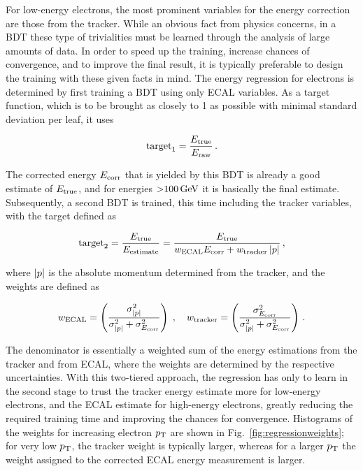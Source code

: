 For low-energy electrons, the most prominent variables for the energy correction are those from the tracker.
% 
While an obvious fact from physics concerns, in a BDT these type of trivialities must be learned through the analysis of large amounts of data.
% 
In order to speed up the training, increase chances of convergence, and to improve the final result, it is typically preferable to design the training with these given facts in mind.
% 
The energy regression for electrons is determined by first training a BDT using only ECAL variables.
%
As a target function, which is to be brought as closely to 1 as possible with minimal standard deviation per leaf, it uses
% 
\begin{linenomath*}
\begin{equation}
\text{target}_1 = \frac{E_\text{true}}{E_\text{raw}}
\,.
\end{equation}
\end{linenomath*}
% 
The corrected energy $E_\text{corr}$ that is yielded by this BDT is already a good estimate of $E_\text{true}$, and for energies ${>}100\,\text{GeV}$ it is basically the final estimate.
% 
Subsequently, a second BDT is trained, this time including the tracker variables, with the target defined as
% 
\begin{linenomath*}
\begin{equation}
\text{target}_2 = 
% 
\frac{\Etrue}{E_\text{estimate}} =
% 
\frac{\Etrue}{ w_\text{ECAL} \Ecorr + w_\text{tracker} \abs{p} }
\,,
\end{equation}
\end{linenomath*}
% 
where $\left| p \right |$ is the absolute momentum determined from the tracker, and the weights are defined as
% 
\begin{linenomath*}
\begin{equation}
w_\text{ECAL} = \left( \frac{\sigma^2_{\left| p \right |}}{\sigma^2_{\left| p \right |} + \sigma^2_{E_\text{corr}}} \right)
\;,\quad
w_\text{tracker} = \left( \frac{\sigma^2_{E_\text{corr}}}{\sigma^2_{\left| p \right |} + \sigma^2_{E_\text{corr}}} \right)
\,.
\end{equation}
\end{linenomath*}
% 
The denominator is essentially a weighted sum of the energy estimations from the tracker and from ECAL, where the weights are determined by the respective uncertainties.
% 
With this two-tiered approach, the regression has only to learn in the second stage to trust the tracker energy estimate more for low-energy electrons, and the ECAL estimate for high-energy electrons, greatly reducing the required training time and improving the chances for convergence.
% 
Histograms of the weights for increasing electron $p_\mathrm{T}$ are shown in Fig.~\ref{fig:regressionweights}; for very low $p_\mathrm{T}$, the tracker weight is typically larger, whereas for a larger $p_\mathrm{T}$ the weight assigned to the corrected ECAL energy measurement is larger.


